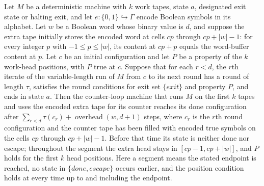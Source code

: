 \begin{theorem}
\label{Turing.counterLoopTMVia_done_segment}
\leanok
{}
Let $M$ be a deterministic machine with $k$ work tapes, state $a$, designated exit state
or halting exit, and let $e:\{0,1\}\hookrightarrow\Gamma$ encode Boolean symbols in
its alphabet. Let $w$ be a Boolean word whose binary value is $d$, and suppose the extra
tape initially stores the encoded word at cells $cp$ through $cp+|w|-1$: for every
integer $p$ with $-1\le p\le |w|$, its content at $cp+p$ equals the word-buffer
content at $p$. Let $c$ be an initial configuration and let $P$ be a property of the $k$
work-head positions, with $P$ true at $c$. Suppose that for each $r<d$, the $r$th
iterate of the variable-length run of $M$ from $c$ to its next round has a round of
length $\tau$, satisfies the round conditions for exit set $\{exit\}$ and property
$P$, and ends in state $a$. Then the counter-loop machine that runs $M$ on the first $k$
tapes and uses the encoded extra tape for its counter reaches its done configuration
after $\sum_{r<d}\tau(c_r)+\operatorname{overhead}(w,d+1)$ steps, where $c_r$ is the
$r$th round configuration and the counter tape has been filled with encoded true symbols
on the cells $cp$ through $cp+|w|-1$. Before that time its state is neither done nor
escape; throughout the segment the extra head stays in $[cp-1,cp+|w|]$, and $P$ holds
for the first $k$ head positions. Here a segment means the stated endpoint is reached,
no state in $\{done,escape\}$ occurs earlier, and the position condition holds at
every time up to and including the endpoint.
\end{theorem}

